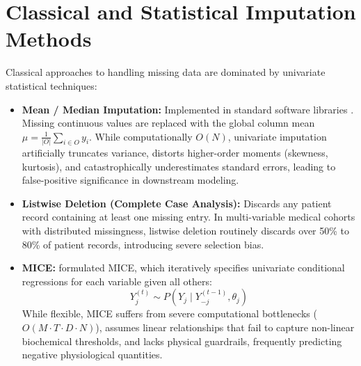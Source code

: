 \documentclass[MTech]{ugthesis}
\begin{document}
\section{Classical and Statistical Imputation Methods}\label{sec:lit_classical}
Classical approaches to handling missing data are dominated by univariate statistical techniques:
\begin{itemize}
    \item \textbf{Mean / Median Imputation:} Implemented in standard software libraries \citep{pedregosa2011scikit}. Missing continuous values are replaced with the global column mean $\mu = \frac{1}{|O|} \sum_{i \in O} y_i$. While computationally $O(N)$, univariate imputation artificially truncates variance, distorts higher-order moments (skewness, kurtosis), and catastrophically underestimates standard errors, leading to false-positive significance in downstream modeling.
    \item \textbf{Listwise Deletion (Complete Case Analysis):} Discards any patient record containing at least one missing entry. In multi-variable medical cohorts with distributed missingness, listwise deletion routinely discards over 50\% to 80\% of patient records, introducing severe selection bias.
    \item \textbf{\ac{MICE}:} \citet{vanbuuren2011mice} formulated \ac{MICE}, which iteratively specifies univariate conditional regressions for each variable given all others:
    \begin{equation}
        Y_j^{(t)} \sim P(Y_j \mid Y_{-j}^{(t-1)}, \theta_j)
    \end{equation}
    While flexible, \ac{MICE} suffers from severe computational bottlenecks ($O(M \cdot T \cdot D \cdot N)$), assumes linear relationships that fail to capture non-linear biochemical thresholds, and lacks physical guardrails, frequently predicting negative physiological quantities.
\end{itemize}
\end{document}
